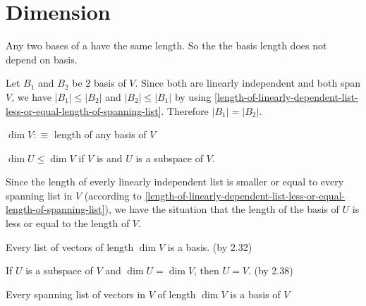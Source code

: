 \section{Dimension}

\setcounter{thm}{33}
\begin{thm} Any two bases of a \fdvs have the same length. So the the basis length does not depend on basis.
\end{thm}
\begin{prf}
  Let $B_1$ and $B_2$ be $2$ basis of $V$. Since both are linearly independent and both span $V$, we have $|B_1| \leq |B_2|$ and $|B_2| \leq |B_1|$ by using \ref{length-of-linearly-dependent-list-less-or-equal-length-of-spanning-list}. Therefore $|B_1|=|B_2|.$
  
\end{prf}

\begin{mydef} [Dimension]
	$\dim V :\equiv$ length of any basis of $V$
\end{mydef}

\setcounter{thm}{36}
\begin{thm} 
  \label{dimension-of-a-subspace}
  $\dim U \leq \dim V$ if $V$ is \fd  and $U$ is a subspace of $V$.
\end{thm}

\begin{prf}
  Since the length of everly linearly independent list is smaller or equal to every spanning list in $V$ (according to \ref{length-of-linearly-dependent-list-less-or-equal-length-of-spanning-list}), we have the situation that the length of the basis of $U$ is less or equal to the length of $V$.
  
\end{prf}


\begin{thm}
  \label{every-lid-list-of-length-dim-v-is -a-basis-of-v}
  Every \lid list of vectors of length $\dim V$ is a basis. (by 2.32)
\end{thm}

\begin{thm} If $U$ is a subspace of $V$ and $\dim U = \dim V$, then $U=V$. (by 2.38)
\end{thm}

\setcounter{thm}{41}
\begin{thm}
  Every spanning list of vectors in $V$ of length $\dim V$ is a basis of $V$
\end{thm}

